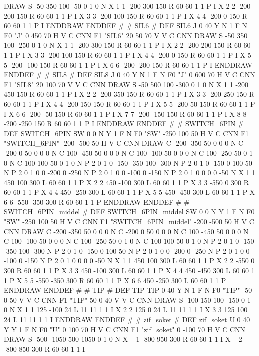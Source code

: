 DRAW
S -50 350 100 -50 0 1 0 N
X 1 1 -200 300 150 R 60 60 1 1 P I
X 2 2 -200 200 150 R 60 60 1 1 P I
X 3 3 -200 100 150 R 60 60 1 1 P I
X 4 4 -200 0 150 R 60 60 1 1 P I
ENDDRAW
ENDDEF
#
# SIL6
#
DEF SIL6 J 0 40 Y N 1 F N
F0 "J" 0 450 70 H V C CNN
F1 "SIL6" 20 50 70 V V C CNN
DRAW
S -50 350 100 -250 0 1 0 N
X 1 1 -200 300 150 R 60 60 1 1 P I
X 2 2 -200 200 150 R 60 60 1 1 P I
X 3 3 -200 100 150 R 60 60 1 1 P I
X 4 4 -200 0 150 R 60 60 1 1 P I
X 5 5 -200 -100 150 R 60 60 1 1 P I
X 6 6 -200 -200 150 R 60 60 1 1 P I
ENDDRAW
ENDDEF
#
# SIL8
#
DEF SIL8 J 0 40 Y N 1 F N
F0 "J" 0 600 70 H V C CNN
F1 "SIL8" 20 100 70 V V C CNN
DRAW
S -50 500 100 -300 0 1 0 N
X 1 1 -200 450 150 R 60 60 1 1 P I
X 2 2 -200 350 150 R 60 60 1 1 P I
X 3 3 -200 250 150 R 60 60 1 1 P I
X 4 4 -200 150 150 R 60 60 1 1 P I
X 5 5 -200 50 150 R 60 60 1 1 P I
X 6 6 -200 -50 150 R 60 60 1 1 P I
X 7 7 -200 -150 150 R 60 60 1 1 P I
X 8 8 -200 -250 150 R 60 60 1 1 P I
ENDDRAW
ENDDEF
#
# SWITCH_6PIN
#
DEF SWITCH_6PIN SW 0 0 N Y 1 F N
F0 "SW" -250 100 50 H V C CNN
F1 "SWITCH_6PIN" -200 -500 50 H V C CNN
DRAW
C -200 -350 50 0 0 0 N
C -200 0 50 0 0 0 N
C 100 -450 50 0 0 0 N
C 100 -100 50 0 0 0 N
C 100 -250 50 0 1 0 N
C 100 100 50 0 1 0 N
P 2 0 1 0  -150 -350  100 -300 N
P 2 0 1 0  -150 0  100 50 N
P 2 0 1 0  0 -200  0 -250 N
P 2 0 1 0  0 -100  0 -150 N
P 2 0 1 0  0 0  0 -50 N
X 1 1 450 100 300 L 60 60 1 1 P
X 2 2 450 -100 300 L 60 60 1 1 P
X 3 3 -550 0 300 R 60 60 1 1 P
X 4 4 450 -250 300 L 60 60 1 1 P
X 5 5 450 -450 300 L 60 60 1 1 P
X 6 6 -550 -350 300 R 60 60 1 1 P
ENDDRAW
ENDDEF
#
# SWITCH_6PIN_middel
#
DEF SWITCH_6PIN_middel SW 0 0 N Y 1 F N
F0 "SW" -250 100 50 H V C CNN
F1 "SWITCH_6PIN_middel" -200 -500 50 H V C CNN
DRAW
C -200 -350 50 0 0 0 N
C -200 0 50 0 0 0 N
C 100 -450 50 0 0 0 N
C 100 -100 50 0 0 0 N
C 100 -250 50 0 1 0 N
C 100 100 50 0 1 0 N
P 2 0 1 0  -150 -350  100 -300 N
P 2 0 1 0  -150 0  100 50 N
P 2 0 1 0  0 -200  0 -250 N
P 2 0 1 0  0 -100  0 -150 N
P 2 0 1 0  0 0  0 -50 N
X 1 1 450 100 300 L 60 60 1 1 P
X 2 2 -550 0 300 R 60 60 1 1 P
X 3 3 450 -100 300 L 60 60 1 1 P
X 4 4 450 -450 300 L 60 60 1 1 P
X 5 5 -550 -350 300 R 60 60 1 1 P
X 6 6 450 -250 300 L 60 60 1 1 P
ENDDRAW
ENDDEF
#
# TIP
#
DEF TIP TIP 0 40 Y N 1 F N
F0 "TIP" -50 0 50 V V C CNN
F1 "TIP" 50 0 40 V V C CNN
DRAW
S -100 150 100 -150 0 1 0 N
X 1 1 125 -100 24 L 11 11 1 1 I
X 2 2 125 0 24 L 11 11 1 1 I
X 3 3 125 100 24 L 11 11 1 1 I
ENDDRAW
ENDDEF
#
# zif_soket
#
DEF zif_soket U 0 40 Y Y 1 F N
F0 "U" 0 100 70 H V C CNN
F1 "zif_soket" 0 -100 70 H V C CNN
DRAW
S -500 -1050 500 1050 0 1 0 N
X ~ 1 -800 950 300 R 60 60 1 1 I
X ~ 2 -800 850 300 R 60 60 1 1 I
